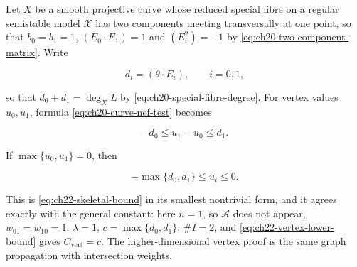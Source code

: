 \begin{example}
\label{ex:ch22-two-vertex}
Let \(X\) be a smooth projective curve whose reduced special fibre on a
regular semistable model \(\mathcal X\) has two components meeting
transversally at one point, so that \(b_0=b_1=1\), \((E_0\cdot E_1)=1\) and
\((E_i^2)=-1\) by \eqref{eq:ch20-two-component-matrix}.  Write

\[
              d_i=(\theta\cdot E_i),\qquad i=0,1,
\]

so that \(d_0+d_1=\deg_XL\) by \eqref{eq:ch20-special-fibre-degree}.  For
vertex values \(u_0,u_1\), formula
\eqref{eq:ch20-curve-nef-test} becomes

\[
                   -d_0\leq u_1-u_0\leq d_1.
\tag{22.55}\label{eq:ch22-two-vertex-bound}
\]

If \(\max\{u_0,u_1\}=0\), then

\[
                   -\max\{d_0,d_1\}\leq u_i\leq0.
\]

This is \eqref{eq:ch22-skeletal-bound} in its smallest nontrivial form, and
it agrees exactly with the general constant: here \(n=1\), so
\(\mathcal A\) does not appear, \(w_{01}=w_{10}=1\), \(\lambda=1\),
\(c=\max\{d_0,d_1\}\), \(\#I=2\), and
\eqref{eq:ch22-vertex-lower-bound} gives
\(C_{\mathrm{vert}}=c\).  The higher-dimensional vertex proof is the same
graph propagation with intersection weights.
\end{example}

